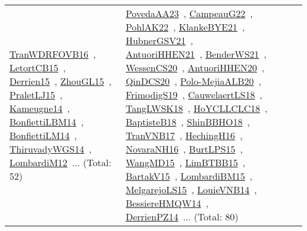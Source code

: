 {\begin{longtable}{lp{3cm}>{\raggedright\arraybackslash}p{6cm}>{\raggedright\arraybackslash}p{6cm}>{\raggedright\arraybackslash}p{8cm}}
\href{works/TranWDRFOVB16.pdf}{TranWDRFOVB16}~\cite{TranWDRFOVB16}, \href{works/LetortCB15.pdf}{LetortCB15}~\cite{LetortCB15}, \href{works/Derrien15.pdf}{Derrien15}~\cite{Derrien15}, \href{works/ZhouGL15.pdf}{ZhouGL15}~\cite{ZhouGL15}, \href{works/PraletLJ15.pdf}{PraletLJ15}~\cite{PraletLJ15}, \href{works/Kameugne14.pdf}{Kameugne14}~\cite{Kameugne14}, \href{works/BonfiettiLBM14.pdf}{BonfiettiLBM14}~\cite{BonfiettiLBM14}, \href{works/BonfiettiLM14.pdf}{BonfiettiLM14}~\cite{BonfiettiLM14}, \href{works/ThiruvadyWGS14.pdf}{ThiruvadyWGS14}~\cite{ThiruvadyWGS14}, \href{works/LombardiM12.pdf}{LombardiM12}~\cite{LombardiM12}... (Total: 52) & \href{works/PovedaAA23.pdf}{PovedaAA23}~\cite{PovedaAA23}, \href{works/CampeauG22.pdf}{CampeauG22}~\cite{CampeauG22}, \href{works/PohlAK22.pdf}{PohlAK22}~\cite{PohlAK22}, \href{works/KlankeBYE21.pdf}{KlankeBYE21}~\cite{KlankeBYE21}, \href{works/HubnerGSV21.pdf}{HubnerGSV21}~\cite{HubnerGSV21}, \href{works/AntuoriHHEN21.pdf}{AntuoriHHEN21}~\cite{AntuoriHHEN21}, \href{works/BenderWS21.pdf}{BenderWS21}~\cite{BenderWS21}, \href{works/WessenCS20.pdf}{WessenCS20}~\cite{WessenCS20}, \href{works/AntuoriHHEN20.pdf}{AntuoriHHEN20}~\cite{AntuoriHHEN20}, \href{works/QinDCS20.pdf}{QinDCS20}~\cite{QinDCS20}, \href{works/Polo-MejiaALB20.pdf}{Polo-MejiaALB20}~\cite{Polo-MejiaALB20}, \href{works/FrimodigS19.pdf}{FrimodigS19}~\cite{FrimodigS19}, \href{works/CauwelaertLS18.pdf}{CauwelaertLS18}~\cite{CauwelaertLS18}, \href{works/TangLWSK18.pdf}{TangLWSK18}~\cite{TangLWSK18}, \href{works/HoYCLLCLC18.pdf}{HoYCLLCLC18}~\cite{HoYCLLCLC18}, \href{works/BaptisteB18.pdf}{BaptisteB18}~\cite{BaptisteB18}, \href{works/ShinBBHO18.pdf}{ShinBBHO18}~\cite{ShinBBHO18}, \href{works/TranVNB17.pdf}{TranVNB17}~\cite{TranVNB17}, \href{works/HechingH16.pdf}{HechingH16}~\cite{HechingH16}, \href{works/NovaraNH16.pdf}{NovaraNH16}~\cite{NovaraNH16}, \href{works/BurtLPS15.pdf}{BurtLPS15}~\cite{BurtLPS15}, \href{works/WangMD15.pdf}{WangMD15}~\cite{WangMD15}, \href{works/LimBTBB15.pdf}{LimBTBB15}~\cite{LimBTBB15}, \href{works/BartakV15.pdf}{BartakV15}~\cite{BartakV15}, \href{works/LombardiBM15.pdf}{LombardiBM15}~\cite{LombardiBM15}, \href{works/MelgarejoLS15.pdf}{MelgarejoLS15}~\cite{MelgarejoLS15}, \href{works/LouieVNB14.pdf}{LouieVNB14}~\cite{LouieVNB14}, \href{works/BessiereHMQW14.pdf}{BessiereHMQW14}~\cite{BessiereHMQW14}, \href{works/DerrienPZ14.pdf}{DerrienPZ14}~\cite{DerrienPZ14}... (Total: 80)\\

\end{longtable}}
